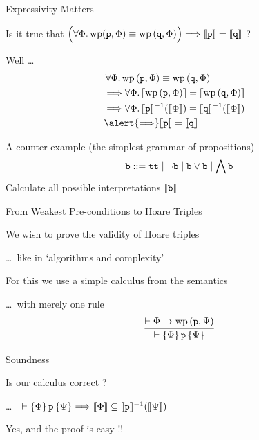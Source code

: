 \documentclass{beamer}
\begin{document}
\begin{frame}{Expressivity Matters}

Is it true that $\Big ( \forall \Phi. \, \mathrm{wp}(\mathtt{p}, \Phi)
\equiv \mathrm{wp} \,(\mathtt{q}, \Phi) \Big ) \Longrightarrow \llbracket \mathtt{p} \rrbracket =
\llbracket \mathtt{q} \rrbracket$ ? 

\pause
\bigskip
Well \dots
\vspace{-0.3cm}
\begin{align*}
        & \, \forall \Phi. \, \mathrm{wp} \, (\prog{p}, \Phi) \equiv \mathrm{wp} \, (\prog{q}, \Phi)
        \\
        & \Longrightarrow 
        \forall \Phi. \, \sem{\mathrm{wp} \, (\prog{p}, \Phi)} = \sem{\mathrm{wp} \, (\prog{q}, \Phi)}
        \\
        & \Longrightarrow 
        \forall \Phi. \, \sem{\prog{p}}^{-1}(\sem{\Phi}) = \sem{\prog{q}}^{-1}(\sem{\Phi}) 
        &
        \\
        & \alert{\Longrightarrow} 
        \sem{\prog{p}} = \sem{\prog{q}} 
\end{align*}
\pause
\vspace{-0.5cm}
\begin{block}{A counter-example (the simplest grammar of propositions) }
        \[
                \mathtt{b} :: = \mathtt{tt} \mid \mathtt{\neg b} \mid \mathtt{b \vee b}
                \mid \bigwedge \mathtt{b}
        \]
        Calculate all possible interpretations $\llbracket \mathtt{b} \rrbracket$
\end{block}
\end{frame}

\begin{frame}{From Weakest Pre-conditions to Hoare Triples}

        We wish to prove the validity of Hoare triples

        \dots \, like in `algorithms and complexity'

        \bigskip
        For this we use a simple calculus from the semantics

        \dots \, with merely one rule
        \[
                \infer{\vdash \{ \Phi \} \, \prog{p} \, \{ \Psi \}}
                { \vdash \Phi \rightarrow \mathrm{wp} \, (\prog{p}, \Psi) }
        \]
\end{frame}

\begin{frame}{Soundness}

        Is our calculus correct ?

        \dots \, \ie\  $\vdash \{ \Phi \} \, \mathtt{p} \, \{ \Psi \} \Longrightarrow
        \llbracket \Phi \rrbracket \subseteq \llbracket \mathtt{p} \rrbracket^{-1}(\llbracket \Psi \rrbracket)$

        \pause
        \bigskip
        \bigskip
        Yes, and the proof is easy !!
\end{frame}
\end{document}
